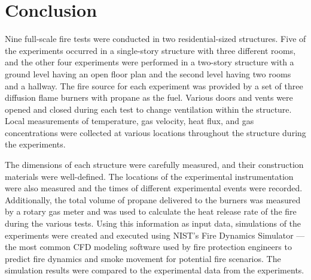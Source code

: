 
\renewcommand{\thechapter}{6}

\chapter{Conclusion}

Nine full-scale fire tests were conducted in two residential-sized structures. Five of the experiments occurred in a single-story structure with three different rooms, and the other four experiments were performed in a two-story structure with a ground level having an open floor plan and the second level having two rooms and a hallway. The fire source for each experiment was provided by a set of three diffusion flame burners with propane as the fuel. Various doors and vents were opened and closed during each test to change ventilation within the structure. Local measurements of temperature, gas velocity, heat flux, and gas concentrations were collected at various locations throughout the structure during the experiments. 

The dimensions of each structure were carefully measured, and their construction materials were well-defined. The locations of the experimental instrumentation were also measured and the times of different experimental events were recorded. Additionally, the total volume of propane delivered to the burners was measured by a rotary gas meter and was used to calculate the heat release rate of the fire during the various tests. Using this information as input data, simulations of the experiments were created and executed using NIST's Fire Dynamics Simulator --- the most common CFD modeling software used by fire protection engineers to predict fire dynamics and smoke movement for potential fire scenarios. The simulation results were compared to the experimental data from the experiments.

